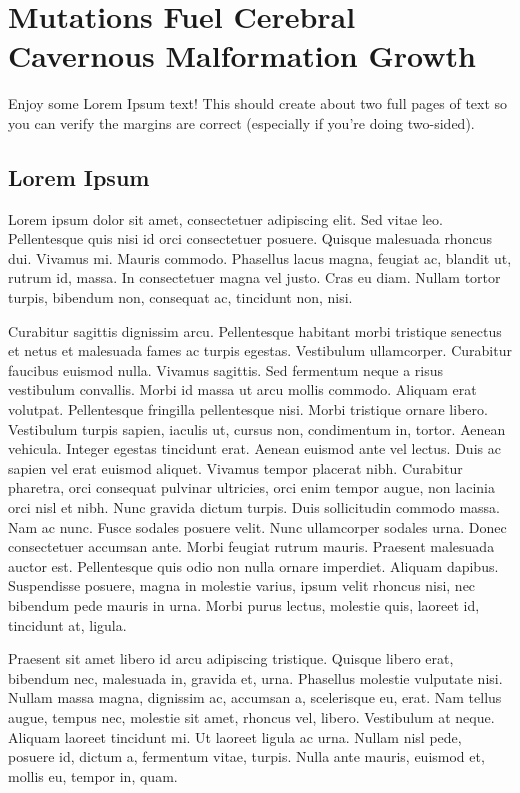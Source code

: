 \chapter{ Mutations Fuel Cerebral Cavernous Malformation Growth}
\label{hello}

Enjoy some Lorem Ipsum text!
This should create about two full pages of text so you can verify the
margins are correct (especially if you're doing two-sided).

\section{Lorem Ipsum}
Lorem ipsum dolor sit amet, consectetuer adipiscing elit. Sed vitae leo.
Pellentesque quis nisi id orci consectetuer posuere. Quisque malesuada
rhoncus dui. Vivamus mi. Mauris commodo. Phasellus lacus magna, feugiat ac,
blandit ut, rutrum id, massa. In consectetuer magna vel justo. Cras eu
diam. Nullam tortor turpis, bibendum non, consequat ac, tincidunt non,
nisi. 

Curabitur sagittis dignissim arcu. Pellentesque habitant morbi
tristique senectus et netus et malesuada fames ac turpis egestas.
Vestibulum ullamcorper. Curabitur faucibus euismod nulla. Vivamus sagittis.
Sed fermentum neque a risus vestibulum convallis. Morbi id massa ut arcu
mollis commodo. Aliquam erat volutpat.  Pellentesque fringilla pellentesque
nisi. Morbi tristique ornare libero. Vestibulum turpis sapien, iaculis ut,
cursus non, condimentum in, tortor. Aenean vehicula. Integer egestas
tincidunt erat. Aenean euismod ante vel lectus. Duis ac sapien vel erat
euismod aliquet. Vivamus tempor placerat nibh. Curabitur pharetra, orci
consequat pulvinar ultricies, orci enim tempor augue, non lacinia orci nisl
et nibh. Nunc gravida dictum turpis.  Duis sollicitudin commodo massa. Nam
ac nunc. Fusce sodales posuere velit. Nunc ullamcorper sodales urna. Donec
consectetuer accumsan ante. Morbi feugiat rutrum mauris. Praesent malesuada
auctor est. Pellentesque quis odio non nulla ornare imperdiet. Aliquam
dapibus. Suspendisse posuere, magna in molestie varius, ipsum velit rhoncus
nisi, nec bibendum pede mauris in urna. Morbi purus lectus, molestie quis,
laoreet id, tincidunt at, ligula. 

Praesent sit amet libero id arcu
adipiscing tristique. Quisque libero erat, bibendum nec, malesuada in,
gravida et, urna. Phasellus molestie vulputate nisi. Nullam massa magna,
dignissim ac, accumsan a, scelerisque eu, erat. Nam tellus augue, tempus
nec, molestie sit amet, rhoncus vel, libero. Vestibulum at neque. Aliquam
laoreet tincidunt mi. Ut laoreet ligula ac urna. Nullam nisl pede, posuere
id, dictum a, fermentum vitae, turpis.  Nulla ante mauris, euismod et,
mollis eu, tempor in, quam. 

